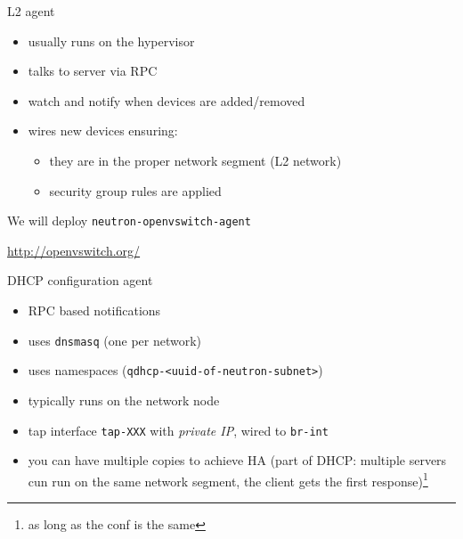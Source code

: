 \documentclass[english,serif,mathserif,xcolor=pdftex,dvipsnames,table]{beamer}
\begin{document}
\begin{frame}
  {L2 agent}
  \begin{itemize}
  \item usually runs on the hypervisor
  \item talks to server via RPC
  \item watch and notify when devices are added/removed
  \item wires new devices ensuring:
    \begin{itemize}
    \item they are in the proper network segment (L2 network)
    \item security group rules are applied
    \end{itemize}
  \end{itemize}

  \+
  We will deploy \texttt{neutron-openvswitch-agent}

  \+
  {\footnotesize\url{http://openvswitch.org/}}
\end{frame}




\begin{frame}
  {DHCP configuration agent}
  \begin{itemize}
  \item RPC based notifications
  \item uses \texttt{dnsmasq} (one per network)
  \item uses namespaces (\texttt{qdhcp-<uuid-of-neutron-subnet>})
  \item typically runs on the network node
  \item tap interface \texttt{tap-XXX} with \textit{private IP}, wired
    to \texttt{br-int}
  \item you can have multiple copies to achieve HA {\scriptsize(part of DHCP:
    multiple servers cun run on the same network segment, the client
    gets the first response)}\footnote{as long as the conf is the same}
  \end{itemize}
\end{frame}
\end{document}
